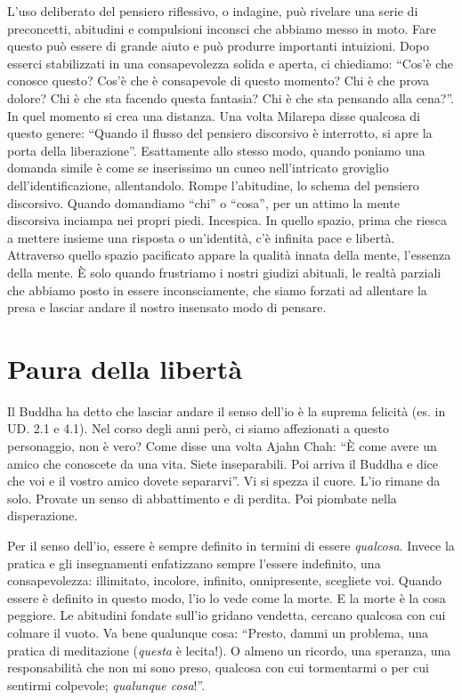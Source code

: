 L'uso deliberato del pensiero riflessivo, o indagine, può rivelare una serie di preconcetti, abitudini e compulsioni inconsci che abbiamo messo in moto. Fare questo può essere di grande aiuto e può produrre importanti intuizioni. Dopo esserci stabilizzati in una consapevolezza solida e aperta, ci chiediamo: ``Cos'è che conosce questo? Cos'è che è consapevole di questo momento? Chi è che prova dolore? Chi è che sta facendo questa fantasia? Chi è che sta pensando alla cena?''. In quel momento si crea una distanza. Una volta Milarepa disse qualcosa di questo genere: ``Quando il flusso del pensiero discorsivo è interrotto, si apre la porta della liberazione''. Esattamente allo stesso modo, quando poniamo una domanda simile è come se inserissimo un cuneo nell'intricato groviglio dell'identificazione, allentandolo. Rompe l'abitudine, lo schema del pensiero discorsivo. Quando domandiamo ``chi'' o ``cosa'', per un attimo la mente discorsiva inciampa nei propri piedi. Incespica. In quello spazio, prima che riesca a mettere insieme una risposta o un'identità, c'è infinita pace e libertà. Attraverso quello spazio pacificato appare la qualità innata della mente, l'essenza della mente. È solo quando frustriamo i nostri giudizi abituali, le realtà parziali che abbiamo posto in essere inconsciamente, che siamo forzati ad allentare la presa e lasciar andare il nostro insensato modo di pensare. 

\section*{Paura della libert\`a}

Il Buddha ha detto che lasciar andare il senso dell'io è la suprema felicità (es. in UD. 2.1 e 4.1). Nel corso degli anni però, ci siamo affezionati a questo personaggio, non è vero? Come disse una volta Ajahn Chah: ``È come avere un amico che conoscete da una vita. Siete inseparabili. Poi arriva il Buddha e dice che voi e il vostro amico dovete separarvi''. Vi si spezza il cuore. L'io rimane da solo. Provate un senso di abbattimento e di perdita. Poi piombate nella disperazione.

Per il senso dell'io, essere è sempre definito in termini di essere \textit{qualcosa}. Invece la pratica e gli insegnamenti enfatizzano sempre l'essere indefinito, una consapevolezza: illimitato, incolore, infinito, onnipresente, scegliete voi. Quando essere è definito in questo modo, l'io lo vede come la morte. E la morte è la cosa peggiore. Le abitudini fondate sull'io gridano vendetta, cercano qualcosa con cui colmare il vuoto. Va bene qualunque cosa: ``Presto, dammi un problema, una pratica di meditazione (\textit{questa }è lecita!). O almeno un ricordo, una speranza, una responsabilità che non mi sono preso, qualcosa con cui tormentarmi o per cui sentirmi colpevole; \textit{qualunque cosa}!''.

